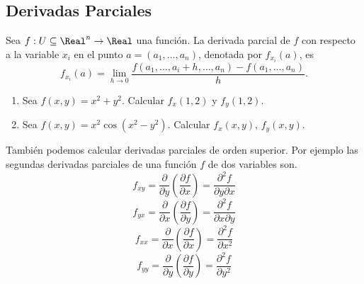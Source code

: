 \subsection{Derivadas Parciales}
\begin{frame}
\subsectionpage
\end{frame}


\begin{frame}
  \begin{defn}
    Sea $f: U\subseteq\Real^n \to \Real$ una función. La derivada parcial de $f$ con respecto a la variable $x_i$ en el punto $a=(a_1, \ldots, a_n)$, denotada por $f_{x_i}(a)$, es
      $$f_{x_i}(a) = \lim_{h \to 0} \frac{f(a_1, \ldots, a_i + h, \ldots, a_n) - f(a_1, \ldots, a_n)}{h}.$$
  \end{defn}
\end{frame}

\begin{frame}
  \begin{eg}
    \begin{enumerate}[<+->]
      \item Sea $f(x,y) = x^2 + y^2$. Calcular $f_x(1,2)$ y $f_y(1,2)$.\\[0.25cm]
      \item Sea $f(x,y) = x^2\cos(x^2-y^2)$. Calcular $f_x(x,y)$, $f_y(x,y)$.\\[0.5cm]
    \end{enumerate}
  \end{eg}
\end{frame}

\begin{frame}
  También podemos calcular derivadas parciales de orden superior. Por ejemplo las segundas derivadas parciales de una función $f$ de dos variables son.\\
  $$f_{xy} = \frac{\partial}{\partial y}\left(\frac{\partial f}{\partial x}\right) = \frac{\partial^2 f}{\partial y\partial x}$$
  $$f_{yx} = \frac{\partial}{\partial x}\left(\frac{\partial f}{\partial y}\right) = \frac{\partial^2 f}{\partial x\partial y}$$
  $$f_{xx} = \frac{\partial}{\partial x}\left(\frac{\partial f}{\partial x}\right) = \frac{\partial^2 f}{\partial x^2}$$
  $$f_{yy} = \frac{\partial}{\partial y}\left(\frac{\partial f}{\partial y}\right) = \frac{\partial^2 f}{\partial y^2}$$
\end{frame}

